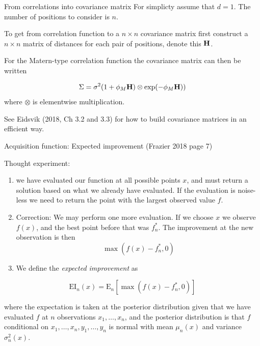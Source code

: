 \documentclass[
  ignorenonframetext,
]{beamer}
\providecommand{\tightlist}{%
  \setlength{\itemsep}{0pt}\setlength{\parskip}{0pt}}
\begin{document}
\begin{frame}
\begin{block}{From correlations into covariance matrix}
\protect\hypertarget{from-correlations-into-covariance-matrix}{}
For simplicty assume that \(d=1\). The number of positions to consider
is \(n\).

To get from correlation function to a \(n \times n\) covariance matrix
first construct a \(n \times n\) matrix of distances for each pair of
positions, denote this \({\bf H}\).

For the Matern-type correlation function the covariance matrix can then
be written

\[ \Sigma=\sigma^2 (1+\phi_M {\bf H}) \otimes \exp(-\phi_M {\bf H}))\]
where \(\otimes\) is elementwise multiplication.

See Eidsvik (2018, Ch 3.2 and 3.3) for how to build covariance matrices
in an efficient way.
\end{block}
\end{frame}

\begin{frame}
\begin{block}{Acquisition function: Expected improvement}
\protect\hypertarget{acquisition-function-expected-improvement}{}
(Frazier 2018 page 7)

Thought experiment:

\begin{enumerate}
[1)]
\item
  we have evaluated our function at all possible points \(x\), and must
  return a solution based on what we already have evaluated. If the
  evaluation is noise-less we need to return the point with the largest
  observed value \(f\).
\item
  Correction: We may perform one more evaluation. If we choose \(x\) we
  observe \(f(x)\), and the best point before that was \(f^{*}_n\). The
  improvement at the new observation is then \[ \max(f(x)-f^{*}_n,0)\]
\end{enumerate}
\end{block}
\end{frame}

\begin{frame}
\begin{enumerate}
[1)]
\setcounter{enumi}{2}
\tightlist
\item
  We define the \emph{expected improvement} as
\end{enumerate}

\[ \text{EI}_n(x)=\text{E}_n[\max(f(x)-f^{*}_n,0)]\]

where the expectation is taken at the posterior distribution given that
we have evaluated \(f\) at \(n\) observations \(x_1,\ldots, x_n\), and
the posterior distribution is that \(f\) conditional on
\(x_1,\ldots,x_n,y_1,\ldots,y_n\) is normal with mean \(\mu_n(x)\) and
variance \(\sigma^2_n(x)\).
\end{frame}
\end{document}

